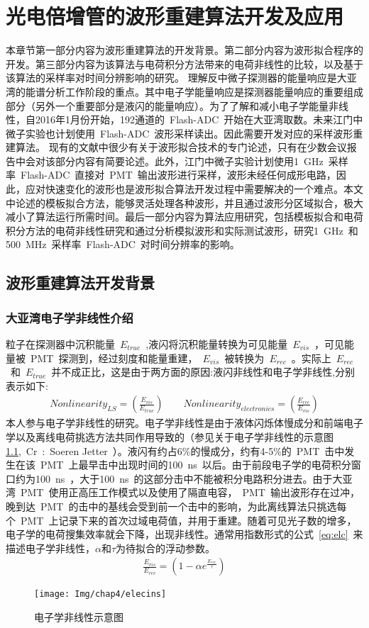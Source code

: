
\chapter{光电倍增管的波形重建算法开发及应用}
\label{chap:chap4}
本章节第一部分内容为波形重建算法的开发背景。第二部分内容为波形拟合程序的开发。第三部分内容为该算法与电荷积分方法带来的电荷非线性的比较，以及基于该算法的采样率对时间分辨影响的研究。
理解反中微子探测器的能量响应是大亚湾的能谱分析工作阶段的重点。其中电子学能量响应是探测器能量响应的重要组成部分（另外一个重要部分是液闪的能量响应）。为了了解和减小电子学能量非线性，自2016年1月份开始，192通道的~Flash-ADC~开始在大亚湾取数。未来江门中微子实验也计划使用~Flash-ADC~波形采样读出。因此需要开发对应的采样波形重建算法。
现有的文献中很少有关于波形拟合技术的专门论述，只有在少数会议报告中会对该部分内容有简要论述。此外，江门中微子实验计划使用1~GHz~采样率~Flash-ADC~直接对~PMT~输出波形进行采样，波形未经任何成形电路，因此，应对快速变化的波形也是波形拟合算法开发过程中需要解决的一个难点。本文中论述的模板拟合方法，能够灵活处理各种波形，并且通过波形分区域拟合，极大减小了算法运行所需时间。最后一部分内容为算法应用研究，包括模板拟合和电荷积分方法的电荷非线性研究和通过分析模拟波形和实际测试波形，研究1~GHz~和500~MHz~采样率~Flash-ADC~对时间分辨率的影响。
\section{波形重建算法开发背景}
\subsection{大亚湾电子学非线性介绍}
粒子在探测器中沉积能量~$E_{true}$~,液闪将沉积能量转换为可见能量~$E_{vis}$~，可见能量被~PMT~探测到，经过刻度和能量重建，~$E_{vis}$~被转换为~$E_{rec}$~。实际上~$E_{rec}$~和~$E_{true}$~并不成正比，这是由于两方面的原因:液闪非线性和电子学非线性,分别表示如下:
\begin{eqnarray}
\label{eq:def}
Nonlinearity_{  LS}=\left( \frac{E_{vis}}{E_{true}} \right) \quad\quad
Nonlinearity_{  electronics}=\left( \frac{E_{rec}}{E_{vis}} \right)
\end{eqnarray}
本人参与电子学非线性的研究。电子学非线性是由于液体闪烁体慢成分和前端电子学以及离线电荷挑选方法共同作用导致的（参见关于电子学非线性的示意图\ref{fig:lscomp},~Cr~:~Soeren Jetter~）。液闪有约占6\%的慢成分，约有4-5\%的~PMT~击中发生在该~PMT~上最早击中出现时间的100~ns~以后。由于前段电子学的电荷积分窗口约为100~ns~，大于100~ns~的这部分击中不能被积分电路积分进去。由于大亚湾~PMT~使用正高压工作模式以及使用了隔直电容，~PMT~输出波形存在过冲，晚到达~PMT~的击中的基线会受到前一个击中的影响，为此离线算法只挑选每个~PMT~上记录下来的首次过域电荷值，并用于重建。随着可见光子数的增多，电子学的电荷搜集效率就会下降，出现非线性。通常用指数形式的公式~\ref{eq:elc}~来描述电子学非线性，$\alpha$和$\tau$为待拟合的浮动参数。
\begin{eqnarray}
\label{eq:elc}
\frac{E_{vis}}{E_{rec}}=(1-\alpha e^{\frac{E_{rec}}{\tau}})
\end{eqnarray}
\begin{figure}[!htbp]
  \centering
   \texttt{[image: Img/chap4/elecins]}
    \caption{电子学非线性示意图}
  \label{fig:lscomp}
\end{figure}
